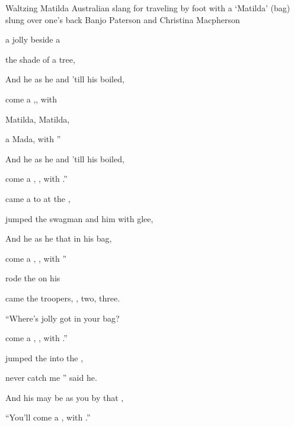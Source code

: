 \begin{SBSong}{Waltzing Matilda}
  {Australian slang for traveling by foot with a `Matilda' (bag) slung over one's back}
  {Banjo Paterson and Christina Macpherson}
  \begin{SBVerse}
     a jolly   beside a 

     the shade of a  tree, 

    And he  as he  and  'till his  boiled, 

     come a ,, with 
  \end{SBVerse}
  \begin{SBChorus}
     Matilda,  Matilda, 

      a  Mada, with '' 

    And he  as he  and  'till his  boiled, 

     come a , , with .'' 
  \end{SBChorus}
  \begin{SBVerse}
     came a  to  at the , 

     jumped the swagman and  him with glee, 

    And he  as he  that  in his  bag, 

     come a , , with ''
  \end{SBVerse} 
  \begin{SBVerse}
     rode the   on his  

     came the troopers, , two, three. 

    ``Where's  jolly   got in your  bag? 

     come a , , with .''
  \end{SBVerse} 
  \begin{SBVerse}
     jumped the   into the , 

     never catch me '' said he. 

    And his  may be  as you  by that , 

    ``{You'll} come a ,  with .'' 
  \end{SBVerse} 
\end{SBSong}
